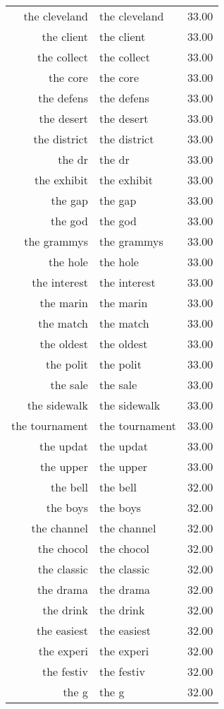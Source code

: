 \begin{table}[ht]
\begin{tabular}{rlr}
  the cleveland & the cleveland & 33.00 \\ 
  the client & the client & 33.00 \\ 
  the collect & the collect & 33.00 \\ 
  the core & the core & 33.00 \\ 
  the defens & the defens & 33.00 \\ 
  the desert & the desert & 33.00 \\ 
  the district & the district & 33.00 \\ 
  the dr & the dr & 33.00 \\ 
  the exhibit & the exhibit & 33.00 \\ 
  the gap & the gap & 33.00 \\ 
  the god & the god & 33.00 \\ 
  the grammys & the grammys & 33.00 \\ 
  the hole & the hole & 33.00 \\ 
  the interest & the interest & 33.00 \\ 
  the marin & the marin & 33.00 \\ 
  the match & the match & 33.00 \\ 
  the oldest & the oldest & 33.00 \\ 
  the polit & the polit & 33.00 \\ 
  the sale & the sale & 33.00 \\ 
  the sidewalk & the sidewalk & 33.00 \\ 
  the tournament & the tournament & 33.00 \\ 
  the updat & the updat & 33.00 \\ 
  the upper & the upper & 33.00 \\ 
  the bell & the bell & 32.00 \\ 
  the boys & the boys & 32.00 \\ 
  the channel & the channel & 32.00 \\ 
  the chocol & the chocol & 32.00 \\ 
  the classic & the classic & 32.00 \\ 
  the drama & the drama & 32.00 \\ 
  the drink & the drink & 32.00 \\ 
  the easiest & the easiest & 32.00 \\ 
  the experi & the experi & 32.00 \\ 
  the festiv & the festiv & 32.00 \\ 
  the g & the g & 32.00 \\ 

\end{tabular}
\end{table}

